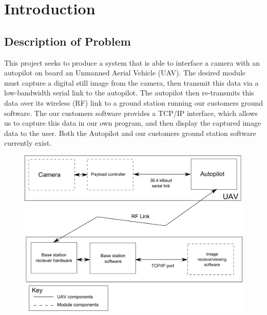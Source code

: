 \chapter{Introduction}

\section{Description of Problem}

This project seeks to produce a system that is able to interface a camera 
with an autopilot on board an Unmanned Aerial Vehicle (UAV). The desired 
module must capture a digital still image from the camera, then transmit 
this data via a low-bandwidth serial link to the autopilot. The autopilot 
then re-transmits this data over its wireless (RF) link to a ground station 
running our customers ground software. The our customers software provides a TCP/IP interface, 
which allows us to capture this data in our own program, and then display 
the captured image data to the user. Both the Autopilot and our customers ground 
station software currently exist.

\begin{figure}[H]
        \centering
        \includegraphics[width=1.00\textwidth]{figures/spec_block_diagram_2.png}
        \label{fig:blockDiagram}
\end{figure}

